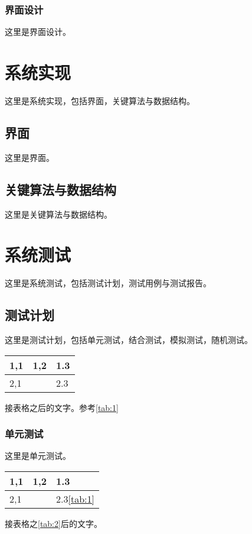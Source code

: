 \documentclass[a4paper]{ecnuthesis}
\begin{document}
\subsubsection{界面设计}
这里是界面设计。

\section{系统实现}
这里是系统实现，包括界面，关键算法与数据结构。

\subsection{界面}
这里是界面。

\subsection{关键算法与数据结构}
这里是关键算法与数据结构。

\section{系统测试}
这里是系统测试，包括测试计划，测试用例与测试报告。

\subsection{测试计划}
这里是测试计划，包括单元测试，结合测试，模拟测试，随机测试。
    \begin{table}
        \centering
        \begin{tabular}{l|l|l}
        \hline
        1,1 & 1,2 & 1.3 \\
        \hline
        2,1 & ~ & 2.3 \\
        \hline
        \end{tabular}
    \end{table}
接表格之后的文字。参考\ref{tab:1}

\subsubsection{单元测试}
这里是单元测试。
\begin{center}
    \begin{table}
        \centering
        \begin{tabular}{l|l|l}
        \hline
        1,1 & 1,2 & 1.3 \\
        \hline
        2,1 & ~ & 2.3\ref{tab:1} \\
        \hline
        \end{tabular}
    \end{table}
\end{center}
接表格之\ref{tab:2}后的文字。
\end{document}
